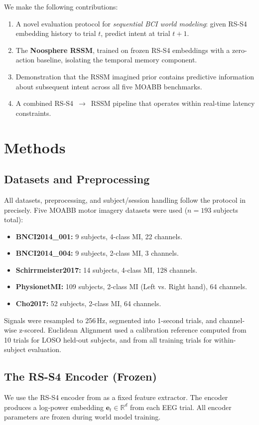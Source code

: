 \documentclass[11pt,a4paper]{article}
\begin{document}
We make the following contributions:
\begin{enumerate}
    \item A novel evaluation protocol for \textit{sequential BCI world modeling}: given RS-S4 embedding history to trial $t$, predict intent at trial $t+1$.
    \item The \textbf{Noosphere RSSM}, trained on frozen RS-S4 embeddings with a zero-action baseline, isolating the temporal memory component.
    \item Demonstration that the RSSM imagined prior contains predictive information about subsequent intent across all five MOABB benchmarks.
    \item A combined RS-S4~$\to$~RSSM pipeline that operates within real-time latency constraints.
\end{enumerate}

\section{Methods}

\subsection{Datasets and Preprocessing}
All datasets, preprocessing, and subject/session handling follow the protocol in \cite{woodall2026rss4} precisely. Five MOABB motor imagery datasets were used ($n=193$ subjects total):
\begin{itemize}
    \item \textbf{BNCI2014\_001:} 9 subjects, 4-class MI, 22 channels.
    \item \textbf{BNCI2014\_004:} 9 subjects, 2-class MI, 3 channels.
    \item \textbf{Schirrmeister2017:} 14 subjects, 4-class MI, 128 channels.
    \item \textbf{PhysionetMI:} 109 subjects, 2-class MI (Left vs. Right hand), 64 channels.
    \item \textbf{Cho2017:} 52 subjects, 2-class MI, 64 channels.
\end{itemize}
Signals were resampled to 256\,Hz, segmented into 1-second trials, and channel-wise z-scored. Euclidean Alignment used a calibration reference computed from 10 trials for LOSO held-out subjects, and from all training trials for within-subject evaluation.

\subsection{The RS-S4 Encoder (Frozen)}
We use the RS-S4 encoder from \cite{woodall2026rss4} as a fixed feature extractor. The encoder produces a log-power embedding $\mathbf{e}_t \in \mathbb{R}^d$ from each EEG trial. All encoder parameters are frozen during world model training.
\end{document}
